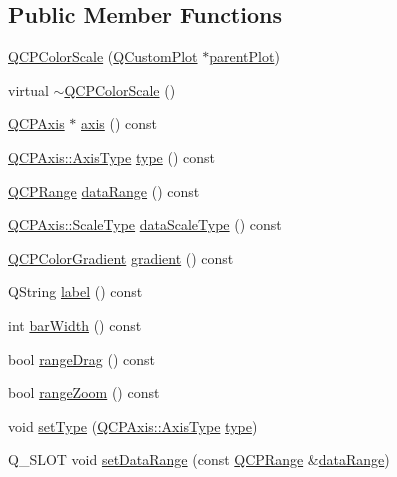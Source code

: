 \subsection*{Public Member Functions}
\begin{DoxyCompactItemize}
\item 
\hyperlink{classQCPColorScale_aa8debce1be38b54287c04d4f584394b4}{Q\+C\+P\+Color\+Scale} (\hyperlink{classQCustomPlot}{Q\+Custom\+Plot} $\ast$\hyperlink{classQCPLayerable_ab7e0e94461566093d36ffc0f5312b109}{parent\+Plot})
\item 
virtual \hyperlink{classQCPColorScale_a49d8d2d155c15fa315fdc0427194c9ea}{$\sim$\+Q\+C\+P\+Color\+Scale} ()
\item 
\hyperlink{classQCPAxis}{Q\+C\+P\+Axis} $\ast$ \hyperlink{classQCPColorScale_a1205bd67c8a33d5818aac1f6eea016a4}{axis} () const 
\item 
\hyperlink{classQCPAxis_ae2bcc1728b382f10f064612b368bc18a}{Q\+C\+P\+Axis\+::\+Axis\+Type} \hyperlink{classQCPColorScale_a9a5236328c97fbfde01e3d91c4fcce6a}{type} () const 
\item 
\hyperlink{classQCPRange}{Q\+C\+P\+Range} \hyperlink{classQCPColorScale_a52134696d5e04074fff4227d92d96f7b}{data\+Range} () const 
\item 
\hyperlink{classQCPAxis_a36d8e8658dbaa179bf2aeb973db2d6f0}{Q\+C\+P\+Axis\+::\+Scale\+Type} \hyperlink{classQCPColorScale_a9718c004421811be97e683d7f7d7ee61}{data\+Scale\+Type} () const 
\item 
\hyperlink{classQCPColorGradient}{Q\+C\+P\+Color\+Gradient} \hyperlink{classQCPColorScale_ac71a6cd853c97a2dbfd32f67afd399df}{gradient} () const 
\item 
Q\+String \hyperlink{classQCPColorScale_af92a62a6e4401f4c5b5e36cc94351ec9}{label} () const 
\item 
int \hyperlink{classQCPColorScale_a0de546f12105cf8bcb00ce60366d3a3d}{bar\+Width} () const 
\item 
bool \hyperlink{classQCPColorScale_a0d45597064cc40bc8a84d11e870c6b05}{range\+Drag} () const 
\item 
bool \hyperlink{classQCPColorScale_a1123986a10acda3cdc371e4d97b3326c}{range\+Zoom} () const 
\item 
void \hyperlink{classQCPColorScale_a1bf9bdb291927c422dd66b404b206f1f}{set\+Type} (\hyperlink{classQCPAxis_ae2bcc1728b382f10f064612b368bc18a}{Q\+C\+P\+Axis\+::\+Axis\+Type} \hyperlink{classQCPColorScale_a9a5236328c97fbfde01e3d91c4fcce6a}{type})
\item 
Q\+\_\+\+S\+L\+OT void \hyperlink{classQCPColorScale_abe88633003a26d1e756aa74984587fef}{set\+Data\+Range} (const \hyperlink{classQCPRange}{Q\+C\+P\+Range} \&\hyperlink{classQCPColorScale_a52134696d5e04074fff4227d92d96f7b}{data\+Range})

\end{DoxyCompactItemize}
